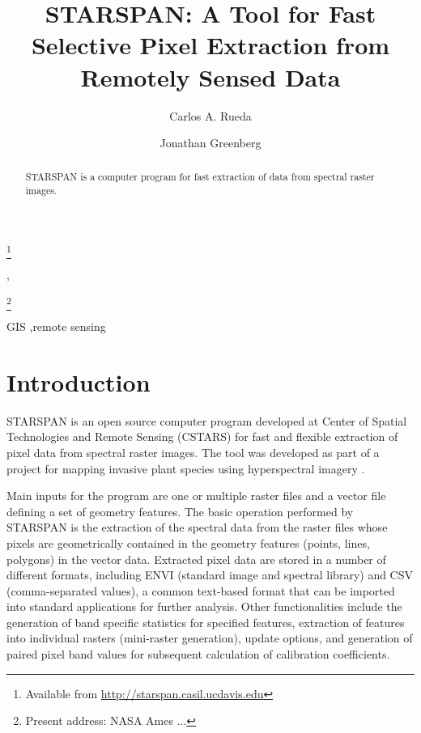 \documentclass{elsart}
\newcommand{\starspan}{STARSPAN{}}
\begin{document}
\begin{frontmatter}

\title{\starspan: 
A Tool for Fast Selective Pixel Extraction 
from Remotely Sensed Data}
\thanks[label1]{Available from \url{http://starspan.casil.ucdavis.edu}}

\author{Carlos A. Rueda},
\author{Jonathan Greenberg}
\thanks[greenberg]{Present address: NASA Ames ...}

\address{Center for Spatial Technologies and Remote Sensing (CSTARS).
The Barn. University of California, Davis. One Shields Avenue, Davis, CA 95616}

\begin{abstract}
	
	\starspan{} is a computer program for fast extraction of data from spectral
	raster images.
	
\end{abstract}

\begin{keyword}
GIS \sep remote sensing
\end{keyword}

\end{frontmatter}


\section{Introduction}\label{intro}

	\starspan{} is an open source computer program developed at Center of
	Spatial Technologies and Remote Sensing (CSTARS) for fast and flexible
	extraction of pixel data from spectral raster images. The tool was developed
	as part of a project for mapping invasive plant species using hyperspectral
	imagery \citep{ustin04}.
	
	Main inputs for the program are one or multiple raster files and a vector
	file defining a set of geometry features. The basic operation performed by
	\starspan{} is the extraction of the spectral data from the raster files
	whose pixels are geometrically contained in the geometry features (points,
	lines, polygons) in the vector data. Extracted pixel data are stored in a
	number of different formats, including ENVI \citep{envi} (standard image and
	spectral library) and CSV (comma-separated values), a common text-based
	format that can be imported into standard applications for further analysis.
	Other functionalities include the generation of band specific statistics for
	specified features, extraction of features into individual rasters
	(mini-raster generation), update options, and generation of paired pixel
	band values for subsequent calculation of calibration coefficients.
	
\end{document}
